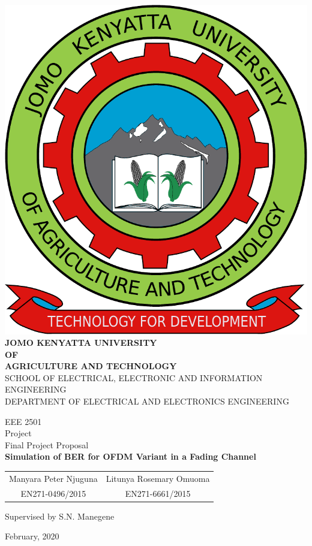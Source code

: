 \begin{titlepage}
  \begin{center}
    \includegraphics[scale=0.2]{Graphics/jkuat-logo.pdf}\\
		\vspace{0.5cm}
		\Large{\textbf{JOMO KENYATTA UNIVERSITY\\OF\\AGRICULTURE AND TECHNOLOGY\\}}
		\vspace{1cm}
		\small{SCHOOL OF ELECTRICAL, ELECTRONIC AND INFORMATION ENGINEERING\\
		DEPARTMENT OF ELECTRICAL AND ELECTRONICS ENGINEERING\\}
		\vspace*{\fill}
	
		\large{EEE 2501\\Project\\Final Project Proposal\\}
		\vspace*{\fill}
		\Large{\textbf{Simulation of BER for OFDM Variant in a Fading Channel}\\}
		\vspace*{\fill}
		\begin{table}[h!]
			\centering
			\renewcommand{\arraystretch}{1.5}
			\begin{tabular}{c c}
				{ Manyara Peter Njuguna} &{ Litunya Rosemary Omuoma}\\
				\textsc{EN271-0496/2015} &\textsc{EN271-6661/2015}\\
			\end{tabular}
		\end{table}
		\vspace*{\fill}
		\large{Supervised by S.N. Manegene}
		\vspace*{\fill}
				
		\Large{February, 2020}
  \end{center}
\end{titlepage}
